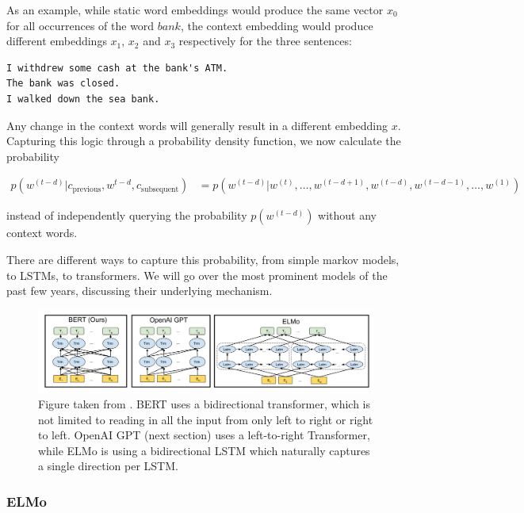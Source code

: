 \documentclass[a4paper,12pt,twoside,openright]{report}
\begin{document}
As an example, while static word embeddings would produce the same vector $x_0$ for all occurrences of the word $bank$, the context embedding would produce different embeddings $x_1$, $x_2$ and $x_3$ respectively for the three sentences:

\begin{verbatim}
I withdrew some cash at the bank's ATM.
The bank was closed.
I walked down the sea bank.
\end{verbatim}

Any change in the context words will generally result in a different embedding $x$.
Capturing this logic through a probability density function, we now calculate the probability

\begin{align}
p(w^{(t-d)} | c_\text{previous}, w^{t-d}, c_\text{subsequent}) &= p(w^{(t-d)} | w^{(t)}, \ldots, w^{(t-d + 1)}, w^{(t-d)}, w^{(t-d - 1)}, \ldots, w^{(1)})
\end{align}{\label{eq:transformer_probability}}

instead of independently querying the probability $p(w^{(t-d)})$ without any context words.

There are different ways to capture this probability, from simple markov models, to LSTMs, to transformers.
We will go over the most prominent models of the past few years, discussing their underlying mechanism.

\begin{figure}[h]
	\center
  \includegraphics[width=\linewidth]{./assets/background/BERT_GPT_ELMo.png}
  \caption{Figure taken from \cite{devlin18}. BERT uses a bidirectional transformer, which is not limited to reading in all the input from only left to right or right to left. OpenAI GPT (next section) uses a left-to-right Transformer, while ELMo is using a bidirectional LSTM which naturally captures a single direction per LSTM. }
  \label{fig:attention_is_all_you_need}
\end{figure}

\subsubsection{ELMo}
\end{document}
